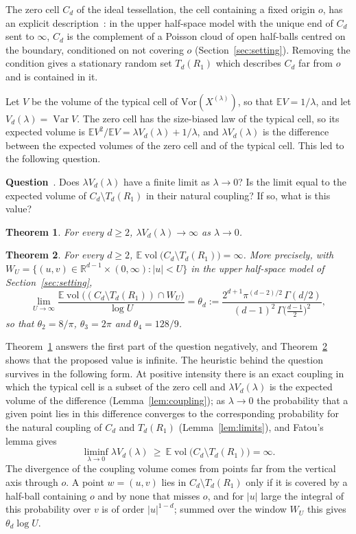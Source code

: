 \documentclass[11pt]{amsart}
\newtheorem{theorem}{Theorem}[section]
\theoremstyle{remark}
\newcommand{\R}{\mathbb{R}}
\newcommand{\E}{\mathbb{E}}
\newcommand{\vol}{\operatorname{vol}}
\begin{document}
The zero cell $C_d$ of the ideal tessellation, the cell containing a fixed origin $o$, has an explicit description~\cite[Theorem~1.4]{DCELU}: in the upper
half-space model with the unique end of $C_d$ sent to $\infty$, $C_d$ is the complement of a Poisson cloud of open
half-balls centred on the boundary, conditioned on not covering $o$ (Section~\ref{sec:setting}). Removing the
condition gives a stationary random set $T_d(R_1)$ which describes $C_d$ far from $o$ and is contained in it.

Let $V$ be the volume of the typical cell of $\mathrm{Vor}(X^{(\lambda)})$, so that $\E V=1/\lambda$, and let
$V_d(\lambda)=\operatorname{Var}V$. The zero cell has the size-biased law of the typical cell, so its expected volume is
$\E V^2/\E V=\lambda V_d(\lambda)+1/\lambda$, and $\lambda V_d(\lambda)$ is the difference between the expected volumes
of the zero cell and of the typical cell. This led to the following question.

\medskip\noindent\textbf{Question}~\cite[Question~7.7]{DCELU}. Does $\lambda V_d(\lambda)$ have a finite limit as
$\lambda\to0$? Is the limit equal to the expected volume of $C_d\setminus T_d(R_1)$ in their natural coupling? If so,
what is this value?
\medskip

\begin{theorem}\label{thm:main}
For every $d\ge2$, $\lambda V_d(\lambda)\to\infty$ as $\lambda\to0$.
\end{theorem}

\begin{theorem}\label{thm:coupling}
For every $d\ge2$, $\E\vol\bigl(C_d\setminus T_d(R_1)\bigr)=\infty$. More precisely, with $W_U=\{(u,v)\in\R^{d-1}\times
(0,\infty):|u|<U\}$ in the upper half-space model of Section~\ref{sec:setting},
\[
\lim_{U\to\infty}\frac{\E\vol\bigl((C_d\setminus T_d(R_1))\cap W_U\bigr)}{\log U}=\theta_d:=
\frac{2^{d+1}\pi^{(d-2)/2}\,\Gamma(d/2)}{(d-1)^2\,\Gamma\bigl(\tfrac{d-1}2\bigr)^2},
\]
so that $\theta_2=8/\pi$, $\theta_3=2\pi$ and $\theta_4=128/9$.
\end{theorem}

Theorem~\ref{thm:main} answers the first part of the question negatively, and Theorem~\ref{thm:coupling} shows that
the proposed value is infinite. The heuristic behind the question survives in the following form. At positive
intensity there is an exact coupling in which the typical cell is a subset of the zero cell and $\lambda V_d(\lambda)$
is the expected volume of the difference (Lemma~\ref{lem:coupling}); as $\lambda\to0$ the probability that a given
point lies in this difference converges to the corresponding probability for the natural coupling of $C_d$ and
$T_d(R_1)$ (Lemma~\ref{lem:limits}), and Fatou's lemma gives
\[
\liminf_{\lambda\to0}\lambda V_d(\lambda)\ \ge\ \E\vol\bigl(C_d\setminus T_d(R_1)\bigr)=\infty.
\]
The divergence of the coupling volume comes from points far from the vertical axis through $o$. A point $w=(u,v)$ lies
in $C_d\setminus T_d(R_1)$ only if it is covered by a half-ball containing $o$ and by none that misses $o$, and for $|u|$ large the
integral of this probability over $v$ is of order $|u|^{1-d}$; summed over the window $W_U$ this gives $\theta_d\log U$.
\end{document}
